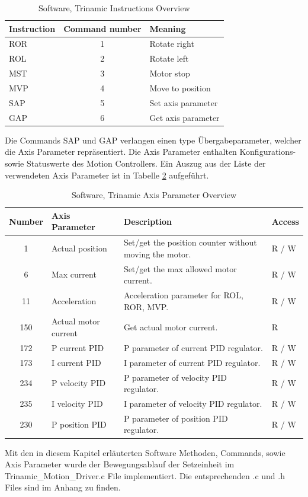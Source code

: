 \begin{table}[H]
	\centering
	\caption{Software, Trinamic Instructions Overview \protect\cite{Trinamic}}
	\begin{tabular}{|l|c|l|}
		\hline
		\textcolor[rgb]{ .247,  .247,  .247}{\textbf{Instruction}} & \textcolor[rgb]{ .247,  .247,  .247}{\textbf{Command number}} & \textcolor[rgb]{ .247,  .247,  .247}{\textbf{Meaning}} \\
		\hline
		ROR   & 1     & Rotate right \\
		\hline
		ROL   & 2     & Rotate left \\
		\hline
		MST   & 3     & Motor stop \\
		\hline
		MVP   & 4     & Move to position \\
		\hline
		SAP   & 5     & Set axis parameter \\
		\hline
		GAP   & 6     & Get axis parameter \\
		\hline
	\end{tabular}%
	\label{tab:Trinamic_instructions}%
\end{table}%

Die Commands SAP und GAP verlangen einen type Übergabeparameter, welcher die Axis Parameter repräsentiert. Die Axis Parameter enthalten Konfigurations- sowie Statuswerte des Motion Controllers. Ein Auszug aus der Liste der verwendeten Axis Parameter ist in Tabelle \ref{tab:Trinamic_Axis_Parameter} aufgeführt.

\begin{table}[H]
	\centering
	\footnotesize
	\caption{Software, Trinamic Axis Parameter Overview \protect\cite{Trinamic}}
	\begin{tabular}{|c|l|l|l|}
		\hline
		\multicolumn{1}{|l|}{\textbf{Number}} & \textbf{Axis Parameter} & \textbf{Description} & \textbf{Access} \\
		\hline
		1     & Actual position & Set/get the position counter without moving the motor. & R / W \\
		\hline
		6     & Max current & Set/get the max allowed motor current. & R / W \\
		\hline
		11    & Acceleration & Acceleration parameter for ROL, ROR, MVP. & R / W \\
		\hline
		150   & Actual motor current & Get actual motor current. & R \\
		\hline
		172   & P current PID & P parameter of current PID regulator. & R / W \\
		\hline
		173   & I current PID & I parameter of current PID regulator. & R / W \\
		\hline
		234   & P velocity PID & P parameter of velocity PID regulator. & R / W \\
		\hline
		235   & I velocity PID & I parameter of velocity PID regulator. & R / W \\
		\hline
		230   & P position PID & P parameter of position PID regulator. & R / W \\
		\hline
	\end{tabular}
	\label{tab:Trinamic_Axis_Parameter}
\end{table}

Mit den in diesem Kapitel erläuterten Software Methoden, Commands, sowie Axis Parameter wurde der Bewegungsablauf der Setzeinheit im Trinamic\_Motion\_Driver.c File implementiert. Die entsprechenden .c und .h Files sind im Anhang zu finden.

